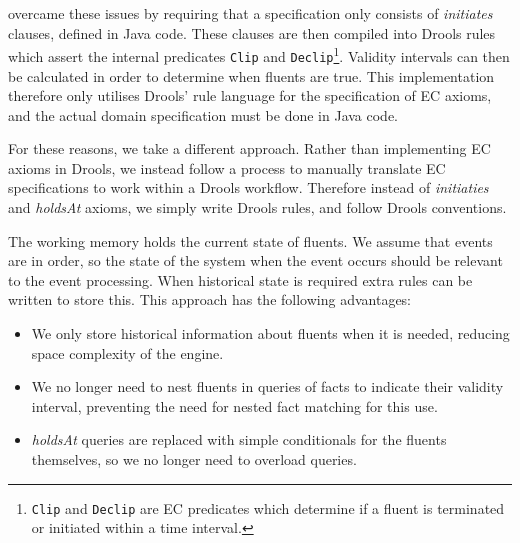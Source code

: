 \citet{Bragaglia2012} overcame these issues by requiring that a specification
only consists of \emph{initiates} clauses, defined in Java code. These clauses
are then compiled into Drools rules which assert the internal predicates
\texttt{Clip} and \texttt{Declip}\footnote{\texttt{Clip} and \texttt{Declip} are \ac{EC} predicates which determine if a fluent is terminated or initiated within a time interval.}. 
Validity intervals can then be calculated
in order to determine when fluents are true. This implementation therefore only
utilises Drools' rule language for the specification of \ac{EC} axioms, and the
actual domain specification must be done in Java code.


For these reasons, we take a different approach. Rather than implementing \ac{EC}
axioms in Drools, we instead follow a process to manually translate \ac{EC}
specifications to work within a Drools workflow. Therefore instead of \emph{initiaties}
and \emph{holdsAt} axioms, we simply write Drools rules, and follow Drools
conventions.

The working memory holds the current state of fluents. We assume that events
are in order, so the state of the system when the event occurs should be
relevant to the event processing. When historical state is required extra
rules can be written to store this. This approach has the following advantages:
\begin{itemize}
\item We only store historical information about fluents when it is needed,
reducing space complexity of the engine.
\item We no longer need to nest fluents in queries of facts to indicate
their validity interval, preventing the need for nested fact matching for this
use.
\item \emph{holdsAt} queries are replaced with simple conditionals for the
fluents themselves, so we no longer need to overload queries.
\end{itemize}

